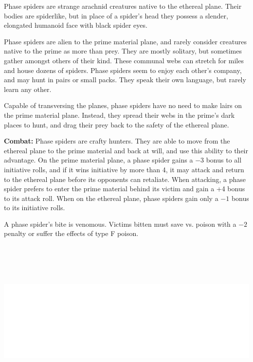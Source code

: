 \begin{multicols}{2}
\begin{minipage}{\columnwidth}
\end{minipage}

Phase spiders are strange arachnid creatures native to the ethereal plane. Their bodies are spiderlike, but in place of a spider's head they possess a slender, elongated humanoid face with black spider eyes.

Phase spiders are alien to  the prime material plane, and rarely consider creatures native to the prime as more than prey. They are mostly solitary, but sometimes gather amongst others of their kind. These communal webs can stretch for miles and house dozens of spiders. Phase spiders seem to enjoy each other's company, and may hunt in pairs or small packs. They speak their own language, but rarely learn any other.

Capable of transversing the planes, phase spiders have no need to make lairs on the prime material plane. Instead, they spread their webs in the prime's dark places to hunt, and drag their prey back to the safety of the ethereal plane.

\textbf{Combat:} Phase spiders are crafty hunters. They are able to move from the ethereal plane to the prime material and back at will, and use this ability to their advantage. On the prime material plane, a phase spider gains a $-3$ bonus to all initiative rolls, and if it wins initiative by more than 4, it may attack and return to the ethereal plane before its opponents can retaliate. When attacking, a phase spider prefers to enter the prime material behind its victim and gain a +4 bonus to its attack roll. When on the ethereal plane, phase spiders gain only a $-1$ bonus to its initiative rolls.

A phase spider's bite is venomous. Victims bitten must save vs. poison with a $-2$ penalty or suffer the effects of type F poison.

\noindent\includegraphics[width=\columnwidth, height=3.25in]{testblock.pdf}


\end{multicols}
